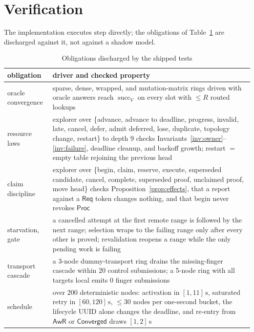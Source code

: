 \documentclass[journal]{IEEEtran}
\newcommand{\succf}{\operatorname{succ}}
\newcommand{\AwR}{\mathsf{AwR}}
\newcommand{\Req}{\mathsf{Req}}
\newcommand{\Proc}{\mathsf{Proc}}
\newcommand{\Converged}{\mathsf{Converged}}
\begin{document}
\section{Verification}\label{sec:verification}

The implementation executes $\mathrm{step}$ directly; the obligations of
Table~\ref{tab:obligations} are discharged against it, not against a shadow
model.

\begin{table}[t]
\caption{Obligations discharged by the shipped tests}
\label{tab:obligations}
\centering\small
\begin{tabular}{@{}>{\raggedright\arraybackslash}p{}>{\raggedright\arraybackslash}p{}@{}}
\toprule
obligation & driver and checked property \\
\midrule
oracle convergence & sparse, dense, wrapped, and mutation-matrix rings driven with oracle answers reach $\succf_V$ on every slot with $\le R$ routed lookups \\
resource laws & explorer over \{advance, advance to deadline, progress, invalid, late, cancel, defer, admit deferred, lose, duplicate, topology change, restart\} to depth $9$ checks Invariants~\ref{inv:owner}--\ref{inv:failure}, deadline cleanup, and backoff growth; restart $=$ empty table rejoining the previous head \\
claim discipline & explorer over \{begin, claim, reserve, execute, superseded candidate, cancel, complete, superseded proof, unclaimed proof, move head\} checks Proposition~\ref{prop:effects}, that a report against a $\Req$ token changes nothing, and that begin never revokes $\Proc$ \\
starvation, gate & a cancelled attempt at the first remote range is followed by the next range; selection wraps to the failing range only after every other is proved; revalidation reopens a range while the only pending work is failing \\
transport cascade & a 3-node dummy-transport ring drains the missing-finger cascade within $20$ control submissions; a 5-node ring with all targets local emits $0$ finger submissions \\
schedule & over $200$ deterministic nodes: activation in $[1,11]\,\mathrm{s}$, saturated retry in $[60,120]\,\mathrm{s}$, $\le30$ nodes per one-second bucket, the lifecycle UUID alone changes the deadline, and re-entry from $\AwR$ or $\Converged$ draws $[1,2]\,\mathrm{s}$ \\
\bottomrule
\end{tabular}
\end{table}
\end{document}
